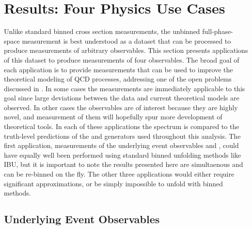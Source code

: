 \FloatBarrier

\section{Results: Four Physics Use Cases}
\label{sec:zjets-results}

Unlike standard binned cross section measurements, the unbinned full-phase-space measurement is best understood as a dataset that can be processed to produce measurements of arbitrary observables.
This section presents applications of this dataset to produce measurements of four observables.
The broad goal of each application is to provide measurements that can be used to improve the theoretical modeling of QCD processes, addressing one of the open problems discussed in .
In some cases the measurements are immediately applicable to this goal since large deviations between the data and current theoretical models are observed.
In other cases the observables are of interest because they are highly novel, and measurement of them will hopefully spur more development of theoretical tools.
In each of these applications the \Omnifold spectrum is compared to the truth-level predictions of the \mgpy and \sherpa generators used throughout this analysis.
The first application, measurements of the underlying event observables \nch and \HT, could have equally well been performed using standard binned unfolding methods like IBU, but it is important to note the results presented here are simultaenous and can be re-binned on the fly.
The other three applications would either require significant approximations, or be simply impossible to unfold with binned methods.

\subsection{Underlying Event Observables}
\label{sec:zjets-results-ue}

